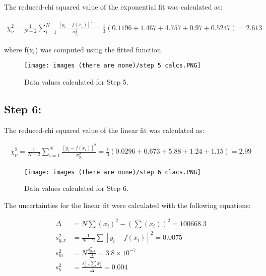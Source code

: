 \documentclass[12pt, letterpaper, twoside]{article}
\begin{document}
The reduced-chi squared value of the exponential fit was calculated as:

\begin{align*}
    \chi_\nu^2 = \frac{1}{N-2}\sum_{i=1}^N\frac{[y_i - f(x_i)]^2}{\sigma_{y_i}^2} = \frac{1}{3}(0.1196+1.467+4.757+0.97+0.5247) = 2.613
\end{align*}

where f(x$_i$) was computed using the fitted function.

\begin{figure}[!ht]
    \centering
    \texttt{[image: images (there are none)/step 5 calcs.PNG]}
    \caption{Data values calculated for Step 5.}
    \label{fig:my_label}
\end{figure}

\subsection{Step 6:}

The reduced-chi squared value of the linear fit was calculated as:

\begin{align*}
    \chi_\nu^2 = \frac{1}{N-2}\sum_{i=1}^N\frac{[y_i - f(x_i)]^2}{\sigma_{y_i}^2} = \frac{1}{3}(0.0296+0.673+5.88+1.24+1.15) = 2.99
\end{align*}

\begin{figure}[!ht]
    \centering
    \texttt{[image: images (there are none)/step 6 clacs.PNG]}
    \caption{Data values calculated for Step 6.}
    \label{fig:my_label}
\end{figure}

The uncertainties for the linear fit were calculated with the following equations:

\begin{align*}
    \Delta &= N\sum(x_i)^2 - (\sum(x_i))^2 = 100668.3 \\
    s_{y,x}^2 &= \frac{1}{N-2}\sum[y_i - f(x_i)]^2 = 0.0075\\
    s_m^2 &= N\frac{s_{y,x}^2}{\Delta} = 3.8 \times 10^{-7} \\
    s_b^2 &= \frac{s_{y,x}^2\sum x_i^2}{\Delta} = 0.004
\end{align*}
\end{document}
